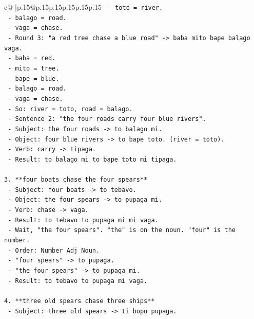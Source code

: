 \documentclass{article}
\begin{document}
{\begin{supertabular}{c@{$\;$}|p{.15\linewidth}@{}p{.15\linewidth}p{.15\linewidth}p{.15\linewidth}p{.15\linewidth}p{.15\linewidth}}
{{{\texttt{        {-} toto = river.} \\
\texttt{        {-} balago = road.} \\
\texttt{        {-} vaga = chase.} \\
\texttt{    {-} Round 3: "a red tree chase a blue road" {-}> baba mito bape balago vaga.} \\
\texttt{        {-} baba = red.} \\
\texttt{        {-} mito = tree.} \\
\texttt{        {-} bape = blue.} \\
\texttt{        {-} balago = road.} \\
\texttt{        {-} vaga = chase.} \\
\texttt{    {-} So: river = toto, road = balago.} \\
\texttt{    {-} Sentence 2: "the four roads carry four blue rivers".} \\
\texttt{    {-} Subject: the four roads {-}> to balago mi.} \\
\texttt{    {-} Object: four blue rivers {-}> to bape toto. (river = toto).} \\
\texttt{    {-} Verb: carry {-}> tipaga.} \\
\texttt{    {-} Result: to balago mi to bape toto mi tipaga.} \\
\\ 
\texttt{3.  **four boats chase the four spears**} \\
\texttt{    {-} Subject: four boats {-}> to tebavo.} \\
\texttt{    {-} Object: the four spears {-}> to pupaga mi.} \\
\texttt{    {-} Verb: chase {-}> vaga.} \\
\texttt{    {-} Result: to tebavo to pupaga mi mi vaga.} \\
\texttt{    {-} Wait, "the four spears". "the" is on the noun. "four" is the number.} \\
\texttt{    {-} Order: Number Adj Noun.} \\
\texttt{    {-} "four spears" {-}> to pupaga.} \\
\texttt{    {-} "the four spears" {-}> to pupaga mi.} \\
\texttt{    {-} Result: to tebavo to pupaga mi vaga.} \\
\\ 
\texttt{4.  **three old spears chase three ships**} \\
\texttt{    {-} Subject: three old spears {-}> ti bopu pupaga.} \\
}}}
\end{supertabular}}
\end{document}
